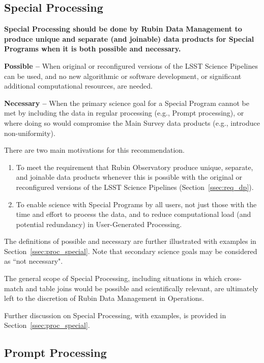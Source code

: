 \subsection{Special Processing}\label{ssec:sci_sproc}

\textbf{Special Processing should be done by Rubin Data Management to 
produce unique and separate (and joinable) data products
for Special Programs when it is both possible and necessary.}

\textbf{Possible -- } When original or reconfigured versions of the LSST
Science Pipelines can be used, and no new algorithmic or software development,
or significant additional computational resources, are needed.

\textbf{Necessary -- } When the primary science goal for a Special Program 
cannot be met by including the data in regular processing (e.g., Prompt processing),
or where doing so would compromise the Main Survey data products (e.g., introduce non-uniformity).

There are two main motivations for this recommendation.

\begin{enumerate}

\item To meet the requirement that Rubin Observatory produce
unique, separate, and joinable data products whenever this is possible 
with the original or reconfigured versions of the LSST Science Pipelines
(Section~\ref{ssec:req_dp}).

\item To enable science with Special Programs by all users, not just those
with the time and effort to process the data, and to reduce computational
load (and potential redundancy) in User-Generated Processing.

\end{enumerate}

The definitions of possible and necessary are further illustrated with examples in Section~\ref{ssec:proc_special}.
Note that secondary science goals may be considered as ``not necessary".

The general scope of Special Processing, including situations in which cross-match and table joins 
would be possible and scientifically relevant, 
are ultimately left to the discretion of Rubin Data Management in Operations.

Further discussion on Special Processing, with examples, is provided in Section~\ref{ssec:proc_special}.

\subsection{Prompt Processing}\label{ssec:sci_pproc}

